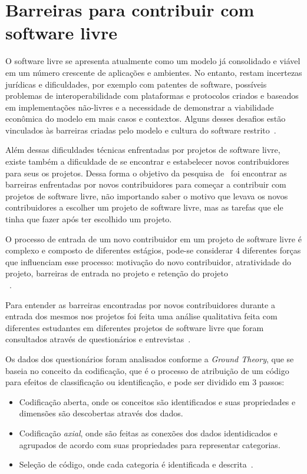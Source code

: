 \chapter{Barreiras para contribuir com software livre}
\label{barreirasSL}

O software livre se apresenta atualmente como um modelo já consolidado e viável
em um número crescente de aplicações e ambientes. No entanto, restam incertezas
jurídicas e dificuldades, por exemplo com patentes de software, possíveis problemas de
interoperabilidade com plataformas e protocolos criados e baseados em implementações
não-livres e a necessidade de demonstrar a viabilidade econômica do modelo em mais
casos e contextos. Alguns desses desafios estão vinculados às barreiras criadas pelo
modelo e cultura do software restrito~\cite{kon2012software}.

Além dessas dificuldades técnicas enfrentadas por projetos de software livre, existe 
também a dificuldade de se encontrar e estabelecer novos contribuidores para seus os
projetos. Dessa forma o objetivo da pesquisa de~ foi encontrar as barreiras enfrentadas 
por novos contribuidores para começar a contribuir com projetos de software livre, 
não importando saber o motivo que levava os novos contribuidores
a escolher um projeto de software livre, mas as tarefas que ele tinha que fazer após
ter escolhido um projeto.

O processo de entrada de um novo contribuidor em um projeto de software livre é complexo
e composto de diferentes estágios, pode-se considerar 4 diferentes forças que influenciam 
esse processo: motivação do novo contribuidor, atratividade do projeto, barreiras de entrada
no projeto e retenção do projeto\\~\cite{Steinmacher:2014:HLO:2593702.2593704, 2049}.

Para entender as barreiras encontradas por novos contribuidores durante a entrada dos
mesmos nos projetos foi feita uma análise qualitativa feita com diferentes estudantes em
diferentes projetos de software livre que foram consultados através de questionários
e entrevistas~\cite{Steinmacher:2014:HLO:2593702.2593704}.

Os dados dos questionários foram analisados conforme a \textit{Ground Theory},
que se baseia no conceito da codificação, que é o processo de atribuição de um código
para efeitos de classificação ou identificação, e pode ser dividido em 3 passos:

\begin{itemize}

\item Codificação aberta, onde os conceitos são identificados e suas propriedades e dimensões
são descobertas através dos dados.

\item Codificação \textit{axial}, onde são feitas as conexões dos dados identidicados e 
agrupados de acordo com suas propriedades para representar categorias.

\item Seleção de código, onde cada categoria é identificada e descrita~\cite{strauss1998basics}.

\end{itemize}

